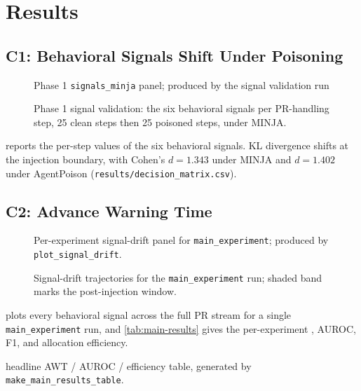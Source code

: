 \section{Results}
\label{sec:results}

\subsection{C1: Behavioral Signals Shift Under Poisoning}
\label{sec:results:c1}

\begin{figure}[tbp]
  \centering
    {Phase 1 \texttt{signals\_minja} panel; produced by the signal
    validation run}
  \caption{Phase 1 signal validation: the six behavioral signals per
  PR-handling step, 25 clean steps then 25 poisoned steps, under
  MINJA.}
  \label{fig:signals-minja}
\end{figure}

 reports the per-step values of the six
behavioral signals. KL divergence shifts at the injection boundary,
with Cohen's $d = 1.343$ under MINJA and $d = 1.402$ under AgentPoison
(\texttt{results/decision\_matrix.csv}).

\subsection{C2: Advance Warning Time}
\label{sec:results:c2}

\begin{figure}[tbp]
  \centering
    {Per-experiment signal-drift panel for \texttt{main\_experiment};
    produced by \texttt{plot\_signal\_drift}.}
  \caption{Signal-drift trajectories for the \texttt{main\_experiment}
  run; shaded band marks the post-injection window.}
  \label{fig:signal-drift}
\end{figure}

 plots every behavioral signal across the full
PR stream for a single \texttt{main\_experiment} run, and
\cref{tab:main-results} gives the per-experiment \awt{}, AUROC, F1,
and allocation efficiency.

\begin{table}[tbp]
  \centering
  \caption{Headline results: per-experiment \awt{}, AUROC, F1, and
  allocation efficiency over the Phase 10 run set. Generated by
  \texttt{make\_main\_results\_table}.}
  \label{tab:main-results}
    {headline AWT / AUROC / efficiency table, generated by
    \texttt{make\_main\_results\_table}.}
\end{table}

